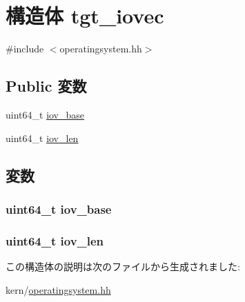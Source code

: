 \hypertarget{structOperatingSystem_1_1tgt__iovec}{
\section{構造体 tgt\_\-iovec}
\label{structOperatingSystem_1_1tgt__iovec}
}


{\ttfamily \#include $<$operatingsystem.hh$>$}\subsection*{Public 変数}
\begin{DoxyCompactItemize}
\item 
uint64\_\-t \hyperlink{structOperatingSystem_1_1tgt__iovec_ac59b8387398fca5cb863b59eb13a8363}{iov\_\-base}
\item 
uint64\_\-t \hyperlink{structOperatingSystem_1_1tgt__iovec_a530d392bf52a29de04bb57ffd97bef5d}{iov\_\-len}
\end{DoxyCompactItemize}


\subsection{変数}
\hypertarget{structOperatingSystem_1_1tgt__iovec_ac59b8387398fca5cb863b59eb13a8363}{
\subsubsection[{iov\_\-base}]{\setlength{\rightskip}{0pt plus 5cm}uint64\_\-t {\bf iov\_\-base}}}
\label{structOperatingSystem_1_1tgt__iovec_ac59b8387398fca5cb863b59eb13a8363}
\hypertarget{structOperatingSystem_1_1tgt__iovec_a530d392bf52a29de04bb57ffd97bef5d}{
\subsubsection[{iov\_\-len}]{\setlength{\rightskip}{0pt plus 5cm}uint64\_\-t {\bf iov\_\-len}}}
\label{structOperatingSystem_1_1tgt__iovec_a530d392bf52a29de04bb57ffd97bef5d}


この構造体の説明は次のファイルから生成されました:\begin{DoxyCompactItemize}
\item 
kern/\hyperlink{operatingsystem_8hh}{operatingsystem.hh}\end{DoxyCompactItemize}
